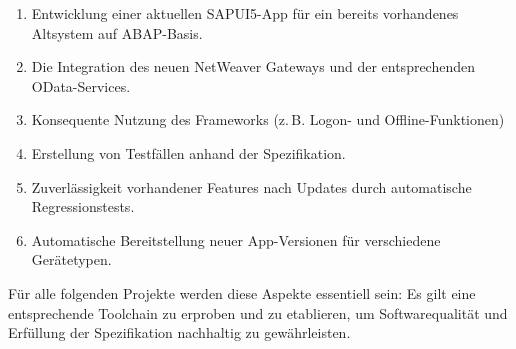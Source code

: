 \documentclass[10pt, a4paper]{article}
\begin{document}
\begin{enumerate}
  \item Entwicklung einer aktuellen SAPUI5-App für ein bereits vorhandenes
  Altsystem auf ABAP-Basis.
  \item Die Integration des neuen NetWeaver Gateways und der entsprechenden
  OData-Services.
  \item Konsequente Nutzung des Frameworks (z.\,B. Logon- und
  Offline-Funktionen)
  \item Erstellung von Testfällen anhand der Spezifikation.
  \item Zuverlässigkeit vorhandener Features nach Updates durch automatische
  Regressionstests.
  \item Automatische Bereitstellung neuer App-Versionen für
  verschiedene Gerätetypen.
\end{enumerate}

Für alle folgenden Projekte werden diese Aspekte essentiell sein: Es gilt eine
entsprechende Toolchain zu erproben und zu etablieren, um
Softwarequalität und Erfüllung der Spezifikation nachhaltig zu gewährleisten.
\end{document}
